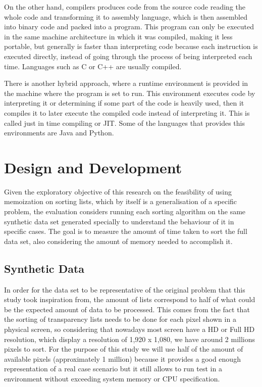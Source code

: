 \documentclass[a4paper,12pt]{article}
\begin{document}
On the other hand, compilers produces code from the source code  reading the whole code and transforming it to assembly language, which is then assembled into binary code and packed into a program. This program can only be executed in the same machine architecture in which it was compiled, making it less portable, but generally is faster than interpreting code because each instruction is executed directly, instead of going through the process of being interpreted each time. Languages such as C or C++ are usually compiled.

There is another hybrid approach, where a runtime environment is provided in the machine where the program is set to run. This environment executes code by interpreting it or determining if some part of the code is heavily used, then it compiles it to later execute the compiled code instead of interpreting it. This is called  just in time compiling or JIT. Some of the languages that provides this environments are Java and Python.

\section{Design and Development}
Given the exploratory objective of this research on the feasibility of using memoization on sorting lists, which by itself is a generalisation of a specific problem, the evaluation considers running each sorting algorithm on the same synthetic data set generated specially to understand the behaviour of it in specific cases. The goal is to measure the amount of time taken to sort the full data set, also considering the amount of memory needed to accomplish it.

\subsection{Synthetic Data}

In order for the data set to be representative of the original problem that this study  took inspiration from, the amount of lists correspond to half of what could be the expected amount of data to be processed. This comes from the fact that the sorting of transparency lists needs to be done for each pixel shown in a physical screen, so considering that nowadays most screen have a HD or Full HD resolution, which display a resolution of 1,920 x 1,080, we have around 2 millions pixels to sort. For the purpose of this study  we will use half of the amount of available pixels (approximately 1 million) because it provides a good enough representation of a real case scenario but it still allows to run test in a environment without exceeding system memory or CPU specification.
\end{document}
